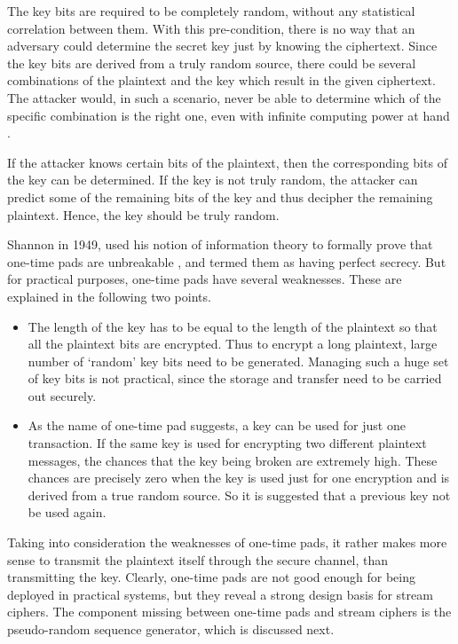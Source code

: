 The key bits are required to be completely random, without any statistical correlation between them. With this pre-condition, there is no way that an adversary could determine the secret key just by knowing the ciphertext. Since the key bits are derived from a truly random source, there could be several combinations of the plaintext and the key which result in the given ciphertext. The attacker would, in such a scenario, never be able to determine which of the specific combination is the right one, even with infinite computing power at hand \cite{one-time-pads-link}.

If the attacker knows certain bits of the plaintext, then the corresponding bits of the key can be determined. If the key is not truly random, the attacker can predict some of the remaining bits of the key and thus decipher the remaining plaintext. Hence, the key should be truly random. 

Shannon in 1949, used his notion of information theory to formally prove that one-time pads are unbreakable \cite{shannon1949cts}, and termed them as having perfect secrecy. But for practical purposes, one-time pads have several weaknesses. These are explained in the following two points.
\begin{itemize}
\item The length of the key has to be equal to the length of the plaintext so that all the plaintext bits are encrypted. Thus to encrypt a long plaintext, large number of `random' key bits need to be generated. Managing such a huge set of key bits is not practical, since the storage and transfer need to be carried out securely. 

\item As the name of one-time pad suggests, a key can be used for just one transaction. If the same key is used for encrypting two different plaintext messages, the chances that the key being broken are extremely high. These chances are precisely zero when the key is used just for one encryption and is derived from a true random source. So it is suggested that a previous key not be used again.
\end{itemize}

Taking into consideration the weaknesses of one-time pads, it rather makes more sense to transmit the plaintext itself through the secure channel, than transmitting the key. Clearly, one-time pads are not good enough for being deployed in practical systems, but they reveal a strong design basis for stream ciphers. The component missing between one-time pads and stream ciphers is the pseudo-random sequence generator, which is discussed next. 

